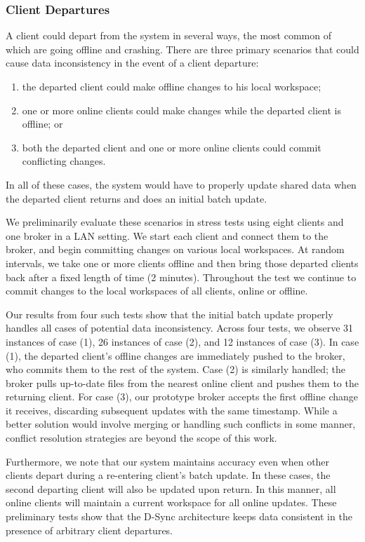 \subsubsection{Client Departures}
A client could depart from the system in several ways,
the most common of which are going offline and crashing.
There are three primary scenarios that could cause
data inconsistency in the event of a client departure:
\begin{enumerate}[(1)]
\item the departed client could make offline changes to his local workspace;
\item one or more online clients could make changes while the departed client is offline; or
\item both the departed client and one or more online clients could commit conflicting changes.
\end{enumerate}
In all of these cases, the system would have to properly update shared data
when the departed client returns and does an initial batch update.

We preliminarily evaluate these scenarios 
in stress tests using eight clients and one broker in a LAN setting.
We start each client and connect them to the broker,
and begin committing changes on various local workspaces.
At random intervals, we take one or more clients offline
and then bring those departed clients back after a fixed length of time (2 minutes).
Throughout the test we continue to commit changes to the local workspaces of all clients, online or offline.

Our results from four such tests show that the initial batch update
properly handles all cases of potential data inconsistency.
Across four tests, we observe 31 instances of case (1),
26 instances of case (2), and 12 instances of case (3).
In case (1), the departed client's offline changes are immediately pushed
to the broker,
who commits them to the rest of the system.
Case (2) is similarly handled;
the broker pulls up-to-date files from the nearest online client
and pushes them to the returning client.
For case (3), our prototype broker accepts the first
offline change it receives, discarding subsequent updates
with the same timestamp.
While a better solution would involve merging or handling
such conflicts in some manner,
conflict resolution strategies are beyond the scope of this work.

Furthermore, we note that our system maintains accuracy
even when other clients depart during a re-entering client's batch update.
In these cases, the second departing client
will also be updated upon return.
In this manner, all online clients will maintain a
current workspace for all online updates.
These preliminary tests show that the D-Sync architecture keeps data consistent
in the presence of arbitrary client departures.



